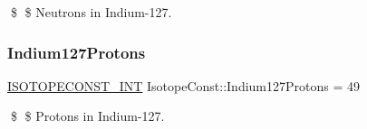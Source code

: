 \$ \$ Neutrons in Indium-\/127. \mbox{\label{group___isotope_const-_indium-_in127_gabac16689dd6d421c205299e2fe479d38}} 
\subsubsection{\texorpdfstring{Indium127\+Protons}{Indium127Protons}}
{\footnotesize\ttfamily \mbox{\hyperlink{group___isotope_const-_macros_ga5f18360b3e99483a35c32d789e62621c}{I\+S\+O\+T\+O\+P\+E\+C\+O\+N\+S\+T\+\_\+\+I\+NT}} Isotope\+Const\+::\+Indium127\+Protons = 49}

\$ \$ Protons in Indium-\/127. 